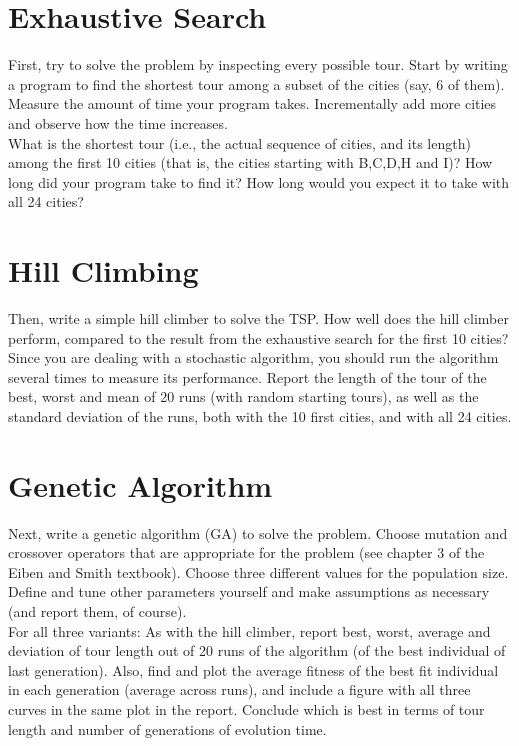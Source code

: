 \documentclass{article}           %
\begin{document}
\section*{Exhaustive Search}
First, try to solve the problem by inspecting every possible tour. Start by
writing a program to find the shortest tour among a subset of the cities (say,
6 of them). Measure the amount of time your program takes. Incrementally add
more cities and observe how the time increases.\\

What is the shortest tour (i.e., the actual sequence of cities, and its
length) among the first 10 cities (that is, the cities starting with B,C,D,H
and I)? How long did your program take to find it? How long would you expect
it to take with all 24 cities?

\section*{Hill Climbing}
Then, write a simple hill climber to solve the TSP. How well does the hill
climber perform, compared to the result from the exhaustive search for the
first 10 cities? Since you are dealing with a stochastic algorithm, you should
run the algorithm several times to measure its performance. Report the length
of the tour of the best, worst and mean of 20 runs (with random starting
tours), as well as the standard deviation of the runs, both with the 10 first
cities, and with all 24 cities.

\section*{Genetic Algorithm}
Next, write a genetic algorithm (GA) to solve the problem. Choose mutation
and crossover operators that are appropriate for the problem (see chapter 3
of the Eiben and Smith textbook). Choose three different values for the
population size. Define and tune other parameters yourself and make
assumptions as necessary (and report them, of course).\\

For all three variants: As with the hill climber, report best, worst, average
and deviation of tour length out of 20 runs of the algorithm (of the best
individual of last generation). Also, find and plot the average fitness of
the best fit individual in each generation (average across runs), and include
a figure with all three curves in the same plot in the report. Conclude which
is best in terms of tour length and number of generations of evolution time.\\
\end{document}
